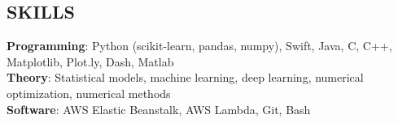 \documentclass[margin]{res}
\begin{document}
\begin{resume}
\section{SKILLS} 
    \textbf{Programming}: Python (scikit-learn, pandas, numpy), Swift, Java, C, C++,\\Matplotlib, Plot.ly, Dash, Matlab\\
    \textbf{Theory}: Statistical models, machine learning, deep learning, numerical optimization, numerical methods \\
    \textbf{Software}: AWS Elastic Beanstalk, AWS Lambda, Git, Bash

\end{resume}
\end{document}
